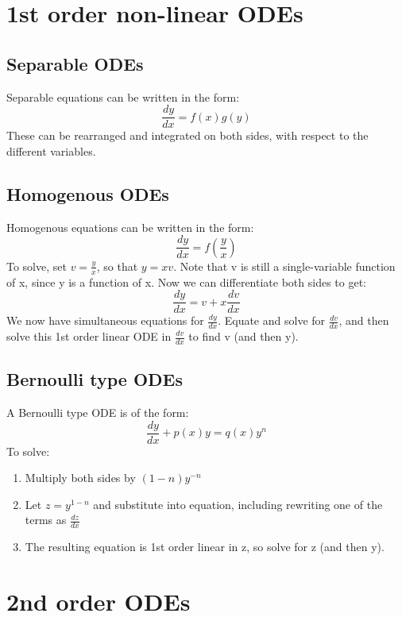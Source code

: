 \documentclass{article}
\begin{document}
\section{1st order non-linear ODEs}

\subsection{Separable ODEs}
Separable equations can be written in the form:
\begin{equation}
\frac{dy}{dx} = f(x)g(y)
\end{equation}
These can be rearranged and integrated on both sides, with respect to the different variables.

\subsection{Homogenous ODEs}
Homogenous equations can be written in the form:
\begin{equation}
\frac{dy}{dx} = f(\frac{y}{x})
\end{equation}
To solve, set $ v = \frac{y}{x} $, so that $y = xv $. Note that v is still a single-variable function of x, since y is a function of x.
Now we can differentiate both sides to get:
\begin{equation}
\frac{dy}{dx} = v + x\frac{dv}{dx}
\end{equation}
We now have simultaneous equations for $ \frac{dy}{dx} $. Equate and solve for $ \frac{dv}{dx} $, and then solve this 1st order linear ODE in $ \frac{dv}{dx} $ to find v (and then y).

\subsection{Bernoulli type ODEs}
A Bernoulli type ODE is of the form:
\begin{equation}
\frac{dy}{dx} + p(x)y = q(x)y^n
\end{equation}
To solve:
\begin{enumerate}
\item Multiply both sides by $ (1-n)y^{-n} $
\item Let $ z = y^{1-n} $ and substitute into equation, including rewriting one of the terms as $ \frac{dz}{dx} $
\item The resulting equation is 1st order linear in z, so solve for z (and then y).
\end{enumerate}

\section{2nd order ODEs}
\end{document}
